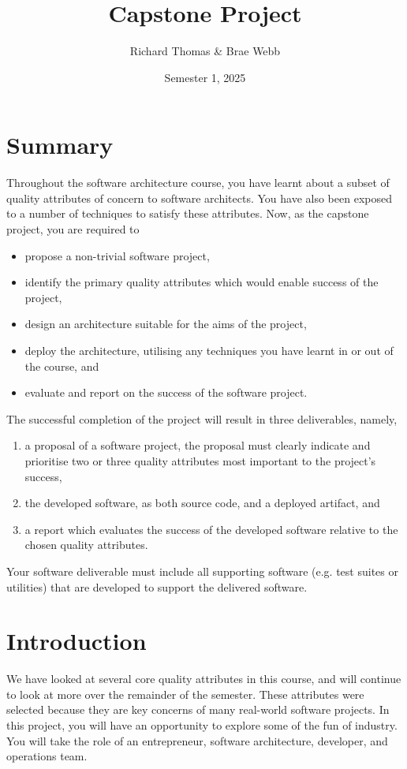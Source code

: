 \documentclass{csse4400}
\title{Capstone Project}
\author{Richard Thomas \& Brae Webb}
\date{Semester 1, 2025}
\begin{document}

\maketitle

\section*{Summary}
Throughout the software architecture course,
you have learnt about a subset of quality attributes of concern to software architects.
You have also been exposed to a number of techniques to satisfy these attributes.
Now, as the capstone project, you are required to
\begin{itemize}
    \item propose a non-trivial software project,
    \item identify the primary quality attributes which would enable success of the project,
    \item design an architecture suitable for the aims of the project,
    \item deploy the architecture, utilising any techniques you have learnt in or out of the course, and
    \item evaluate and report on the success of the software project.
\end{itemize}

\noindent
The successful completion of the project will result in three deliverables, namely,
\begin{enumerate}[label=\roman*]
    \item a proposal of a software project, the proposal must clearly indicate and prioritise two or three quality attributes most important to the project's success,
    \item the developed software, as both source code, and a deployed artifact, and
    \item a report which evaluates the success of the developed software relative to the chosen quality attributes.
\end{enumerate}

\noindent
Your software deliverable must include all supporting software (e.g. test suites or utilities) that are developed to support the delivered software.


\section{Introduction}
We have looked at several core quality attributes in this course, and will continue to look at more over the remainder of the semester.
These attributes were selected because they are key concerns of many real-world software projects.
In this project, you will have an opportunity to explore some of the fun of industry.
You will take the role of an entrepreneur, software architecture, developer, and operations team.
\end{document}
